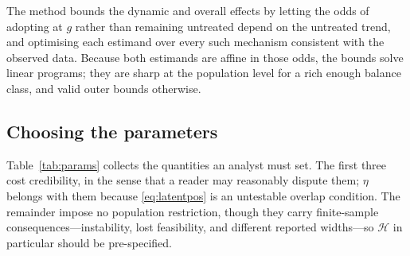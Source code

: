 \documentclass[12pt]{article}
\theoremstyle{remark}
\begin{document}
The method bounds the dynamic and overall effects by letting the odds of adopting at $g$
rather than remaining untreated depend on the untreated trend, and optimising each
estimand over every such mechanism consistent with the observed data. Because both
estimands are affine in those odds, the bounds solve linear programs; they are sharp at
the population level for a rich enough balance class, and valid outer bounds otherwise.

\subsection{Choosing the parameters}
\label{sec:choosing}

Table~\ref{tab:params} collects the quantities an analyst must set. The first three cost
credibility, in the sense that a reader may reasonably dispute them; $\eta$ belongs with
them because \eqref{eq:latentpos} is an untestable overlap condition. The remainder impose
no population restriction, though they carry finite-sample consequences---instability,
lost feasibility, and different reported widths---so $\mathcal{H}$ in particular should be
pre-specified.
\end{document}
